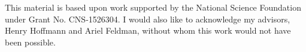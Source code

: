 \acknowledgments
This material is based upon work supported by the National Science Foundation
under Grant No. CNS-1526304. I would also like to acknowledge my advisors, Henry
Hoffmann and Ariel Feldman, without whom this work would not have been possible.

